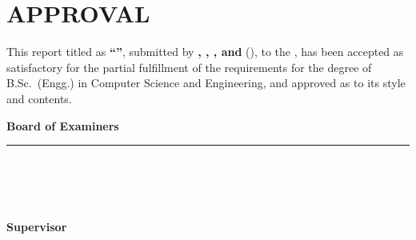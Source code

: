 \chapter*{APPROVAL}
\thispagestyle{empty}
This report titled as \textbf{``\reporttitle''}, submitted by \textbf{\studentonename, \studenttwoname, \studentthreename, and \studentfourname} (\teamname), to the \deptname, \uniname has been accepted as satisfactory for the partial fulfillment of the requirements for the degree of B.Sc.\ (Engg.) in Computer Science and Engineering, and approved as to its style and contents.

\vspace{1cm}

\noindent\textbf{Board of Examiners}

\vspace{1cm}

\noindent\rule{6cm}{0.4pt}\\
\textbf{\supervisorname}\\
\textbf{\supervisortitle}\\
\supervisordept\\
\uniname \hfill \textbf{Supervisor}

\vspace{1cm}
